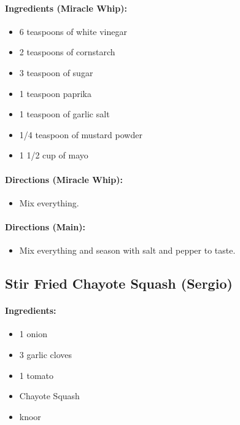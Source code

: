 \documentclass{article}
\begin{document}
\paragraph{Ingredients (Miracle Whip):}
\begin{itemize}
    \item 6 teaspoons of white vinegar
    \item 2 teaspoons of cornstarch
    \item 3 teaspoon of sugar
    \item 1 teaspoon paprika
    \item 1 teaspoon of garlic salt
    \item 1/4 teaspoon of mustard powder
    \item 1 1/2 cup of mayo
\end{itemize}  

\paragraph{Directions (Miracle Whip):}
\begin{itemize}
    \item Mix everything.
\end{itemize}  

\paragraph{Directions (Main):}
\begin{itemize}
    \item Mix everything and season with salt and pepper to taste.
\end{itemize} 

\subsection{Stir Fried Chayote Squash (Sergio)}

\paragraph{Ingredients:}
\begin{itemize}
    \item 1 onion
    \item 3 garlic cloves
    \item 1 tomato
    \item Chayote Squash
    \item knoor
\end{itemize}
\end{document}
